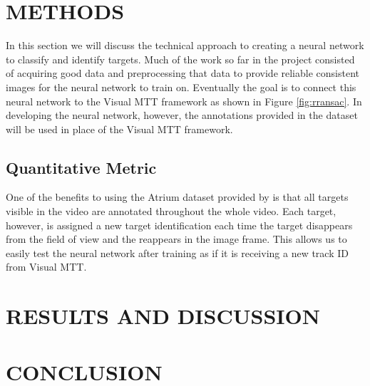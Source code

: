 \documentclass[letterpaper, 10 pt, conference]{ieeeconf}  %
\begin{document}
\section{METHODS} \label{METHODS}

In this section we will discuss the technical approach to creating a neural network to classify and identify targets. Much of the work so far in the project consisted of acquiring good data and preprocessing that data to provide reliable consistent images for the neural network to train on. Eventually the goal is to connect this neural network to the Visual MTT framework as shown in Figure \ref{fig:rransac}. In developing the neural network, however, the annotations provided in the dataset will be used in place of the Visual MTT framework.

\subsection{Quantitative Metric}

One of the benefits to using the Atrium dataset provided by \cite{jodoin2014urban} is that all targets visible in the video are annotated throughout the whole video. Each target, however, is assigned a new target identification each time the target disappears from the field of view and the reappears in the image frame. This allows us to easily test the neural network after training as if it is receiving a new track ID from Visual MTT. 



\section{RESULTS AND DISCUSSION} \label{RESULTS}




\section{CONCLUSION} \label{CONCLUSION}











\end{document}
